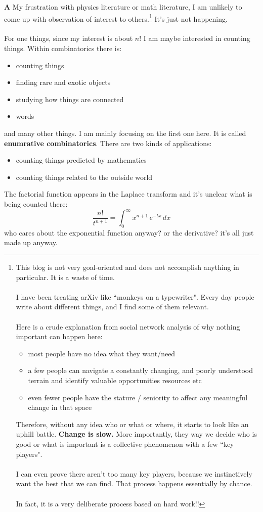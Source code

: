 \documentclass[12pt]{article}
\begin{document}
\noindent \textbf{A} My frustration with physics literature or math literature, I am unlikely to come up with observation of interest to others.\footnote{
This blog is not very goal-oriented and does not accomplish anything in particular.  It is a waste of time.  \\ \\   I have been treating arXiv like ``monkeys on a typewriter".  Every day people write about different things, and I find some of them relevant.  \\ \\
Here is a crude explanation from social network analysis of why nothing important can happen here:
\begin{itemize}
\item most people have no idea what they want/need
\item a few people can navigate a constantly changing, and poorly understood terrain and identify valuable opportunities resources etc
\item even fewer people have the stature / seniority to affect any meaningful change in that space
\end{itemize}
Therefore, without any idea who or what or where, it starts to look like an uphill battle.  \textbf{Change is slow.}  More importantly, they way we decide who is good or what is important is a collective phenomenon with a few ``key players".  \\ \\
I can even prove there aren't too many key players, because we instinctively want the best that we can find.  That process happens essentially by chance. \\ \\ In fact, it is a very deliberate process based on hard work!!} 
 It's just not happening. \\ \\
For one things, since my interest is about $n!$ I am maybe interested in counting things.  Within combinatorics there is:
\begin{itemize}
\item counting things
\item finding rare and exotic objects
\item studying how things are connected
\item words
\end{itemize}
and many other things.  I am mainly focusing on the first one here.  It is called \textbf{enumrative combinatorics}.  There are two kinds of applications:
\begin{itemize}
\item counting things predicted by mathematics
\item counting things related to the outside world
\end{itemize}
\newpage \noindent The factorial function appears in the Laplace transform and it's unclear what is being counted there:
$$ \frac{n!}{t^{n+1}} = \int_0^\infty x^{n+1} \, e^{-tx} \, dx $$ 
who cares about the exponential function anyway?  or the derivative?  it's all just made up anyway.
\end{document}
